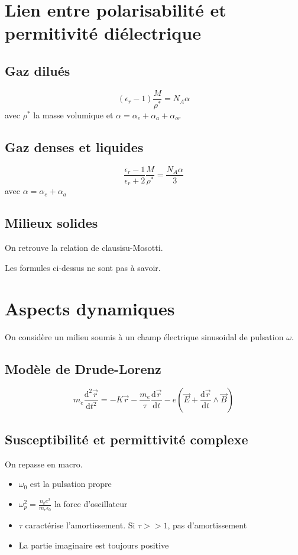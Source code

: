 \documentclass[french]{yLectureNote}
\renewcommand{\vec}{\overrightarrow}
\newcommand{\dd}{\mathrm{d}}
\begin{document}
\section{Lien entre polarisabilité et permitivité diélectrique}
\subsection{Gaz dilués}
\begin{theorem}
    $$(\epsilon_r-1)\frac{M}{\rho^*}=N_A\alpha$$ avec $\rho^*$ la masse volumique et $\alpha = \alpha_e+\alpha_a+\alpha_{or}$
\end{theorem}
\subsection{Gaz denses et liquides}
\begin{theorem}
    $$\frac{\epsilon_r-1}{\epsilon_r+2}\frac{M}{\rho^*}= \frac{N_A \alpha}{3}$$ avec $\alpha = \alpha_e+\alpha_a$
\end{theorem}
\subsection{Milieux solides}
On retrouve la relation de clausisu-Mosotti.

Les formules ci-dessus ne sont pas à savoir.
\section{Aspects dynamiques}
On considère un milieu soumis à un champ électrique sinusoidal de pulsation $\omega$.
\subsection{Modèle de Drude-Lorenz}
\begin{theorem}
    $$m_e\frac{\dd^2 \vec{r}}{\dd t^2}=-K\vec{r}-\frac{m_e}{\tau}\frac{\dd \vec{r}}{\dd t}-e(\vec{E}+\frac{\dd \vec{r}}{\dd t}\wedge \vec{B})$$
\end{theorem}
\subsection{Susceptibilité et permittivité complexe}
On repasse en macro.
\begin{itemize}
    \item $\omega_0$ est la pulsation propre
    \item $\omega_p^2 = \frac{n_ve^2}{m_e\epsilon_0}$ la force d'oscillateur
    \item $\tau$ caractérise l'amortissement. Si $\tau >> 1$, pas d'amortissement
    \item La partie imaginaire est toujours positive
\end{itemize}
\end{document}
